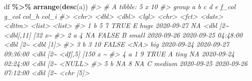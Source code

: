 \documentclass[
]{report}
\newenvironment{Shaded}{\begin{snugshade}}{\end{snugshade}}
\newcommand{\CommentTok}[1]{\textcolor[rgb]{0.56,0.35,0.01}{\textit{#1}}}
\newcommand{\KeywordTok}[1]{\textcolor[rgb]{0.13,0.29,0.53}{\textbf{#1}}}
\newcommand{\NormalTok}[1]{#1}
\newcommand{\OperatorTok}[1]{\textcolor[rgb]{0.81,0.36,0.00}{\textbf{#1}}}
\newcommand{\StringTok}[1]{\textcolor[rgb]{0.31,0.60,0.02}{#1}}
\begin{document}
\begin{Shaded}
\begin{Highlighting}[]
\NormalTok{df }\OperatorTok{\%\textgreater{}\%}
\StringTok{  }\KeywordTok{arrange}\NormalTok{(}\KeywordTok{desc}\NormalTok{(a))}
\CommentTok{\#\textgreater{} \# A tibble: 5 x 10}
\CommentTok{\#\textgreater{}   group     a     b c     d     e      f\_col      g\_col               col\_h    col\_i           }
\CommentTok{\#\textgreater{}   \textless{}chr\textgreater{} \textless{}dbl\textgreater{} \textless{}dbl\textgreater{} \textless{}lgl\textgreater{} \textless{}chr\textgreater{} \textless{}fct\textgreater{}  \textless{}date\textgreater{}     \textless{}dttm\textgreater{}              \textless{}list\textgreater{}   \textless{}list\textgreater{}          }
\CommentTok{\#\textgreater{} 1 b         5     7 TRUE  E     huge   2020{-}09{-}27 NA                  \textless{}dbl [2\textasciitilde{} \textless{}dbl[,11] [32 x\textasciitilde{}}
\CommentTok{\#\textgreater{} 2 a         4    NA FALSE B     small  2020{-}09{-}26 2020{-}09{-}25 04:48:00 \textless{}dbl [2\textasciitilde{} \textless{}dbl [1]\textgreater{}       }
\CommentTok{\#\textgreater{} 3 b         3    10 FALSE \textless{}NA\textgreater{}  big    2020{-}09{-}24 2020{-}09{-}27 09:36:00 \textless{}dbl [2\textasciitilde{} \textless{}df[,5] [150 x \textasciitilde{}}
\CommentTok{\#\textgreater{} 4 a         1     9 TRUE  A     tiny   NA         2020{-}09{-}24 02:24:00 \textless{}dbl [2\textasciitilde{} \textless{}NULL\textgreater{}          }
\CommentTok{\#\textgreater{} 5 b        NA     8 NA    C     medium 2020{-}09{-}25 2020{-}09{-}26 07:12:00 \textless{}dbl [2\textasciitilde{} \textless{}chr [5]\textgreater{}}
\end{Highlighting}
\end{Shaded}


  
\end{document}
